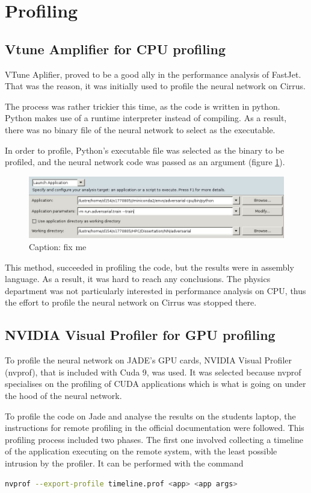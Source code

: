  
 \section{Profiling}
 \subsection{Vtune Amplifier for CPU profiling}
VTune Aplifier, proved to be a good ally in the performance analysis of FastJet. That was the reason, it was initially used to profile the neural network on Cirrus.

The process was rather trickier this time, as the code is written in python. Python makes use of a runtime interpreter instead of compiling. As a result, there was no binary file of the neural network to select as the executable. 

In order to profile, Python's executable file was selected as the binary to be profiled, and the neural network code was passed as an argument (figure \ref{fig:vtunenn1}).  

\begin{figure}[H]
    \centering
    \includegraphics[width=\linewidth]{images/vtunenn.JPG}
    \caption{Caption: fix me}
    \label{fig:vtunenn1}
\end{figure}

This method, succeeded in profiling the code, but the results were in assembly language. As a result, it was hard to reach any conclusions. The physics department was not particularly interested in performance analysis on CPU, thus the effort to profile the neural network on Cirrus was stopped there.

 
 \subsection{NVIDIA Visual Profiler for GPU profiling}
 To profile the neural network on JADE's GPU cards, NVIDIA Visual Profiler (nvprof), that is included with Cuda 9, was used. It was selected because nvprof specialises on the profiling of CUDA applications which is what is going on under the hood of the neural network.
 
 To profile the code on Jade and analyse the results on the students laptop, the instructions for remote profiling in the official documentation\cite{nvprof} were followed. This profiling process included two phases. The first one involved collecting a timeline of the application executing on the remote system, with the least possible intrusion by the profiler. It can be performed with the command 
 \begin{lstlisting}[language=bash]
nvprof --export-profile timeline.prof <app> <app args> \end{lstlisting}

